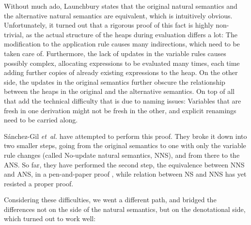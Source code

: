 \documentclass{jfp1}
\theoremstyle{nonumberbreak}
\begin{document}
Without much ado, Launchbury states that the original natural semantics and the alternative natural semantics are equivalent, which is intuitively obvious. Unfortunately, it turned out that a rigorous proof of this fact is highly non-trivial, as the actual structure of the heaps during evaluation differs a lot: The modification to the application rule causes many indirections, which need to be taken care of. Furthermore, the lack of updates in the variable rules causes possibly complex, allocating expressions to be evaluated many times, each time adding further copies of already existing expressions to the heap. On the other side, the updates in the original semantics further obscure the relationship between the heaps in the original and the alternative semantics. On top of all that add the technical difficulty that is due to naming issues: Variables that are fresh in one derivation might not be fresh in the other, and explicit renamings need to be carried along.

S{\'a}nchez-Gil {\em et~al.} have attempted to perform this proof. They broke it down into two smaller steps, going from the original semantics to one with only the variable rule changes (called No-update natural semantics, NNS), and from there to the ANS. So far, they have performed the second step, the equivalence between NNS and ANS, in a pen-and-paper proof , while relation between NS and NNS has yet resisted a proper proof.

Considering these difficulties, we went a different path, and bridged the differences not on the side of the natural semantics, but on the denotational side, which turned out to work well:
\end{document}
